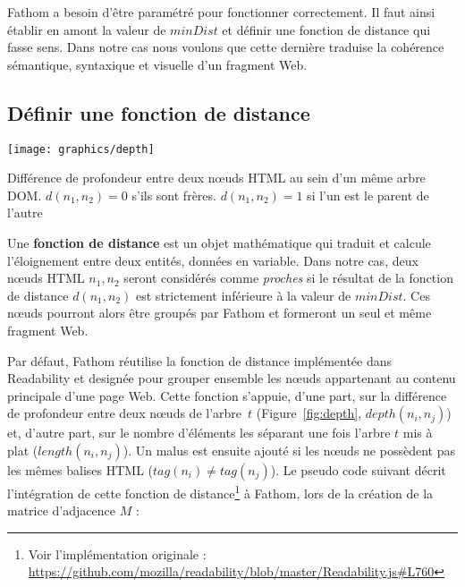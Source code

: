 \documentclass[symmetric,justified,marginals=raggedouter]{tufte-book}
\begin{document}
\noindent Fathom a besoin d'être paramétré pour fonctionner correctement. Il faut ainsi établir en amont la valeur de $minDist$ et définir une fonction de distance qui fasse sens. Dans notre cas nous voulons que cette dernière traduise la cohérence sémantique, syntaxique et visuelle d'un fragment Web. 

\subsection{Définir une fonction de distance}

\begin{marginfigure}%
  \texttt{[image: graphics/depth]}
  \vspace*{0.2cm}  
  \caption{Différence de profondeur entre deux nœuds HTML au sein d'un même arbre DOM. $d(n_1,n_2)=0$ s'ils sont frères. $d(n_1,n_2)=1$ si l'un est le parent de l'autre}
  \label{fig:depth}
\end{marginfigure}

\noindent Une \textbf{fonction de distance} est un objet mathématique qui traduit et calcule l'éloignement entre deux entités, données en variable. Dans notre cas, deux nœuds HTML $n_1,n_2$ seront considérés comme \textit{proches} si le résultat de la fonction de distance $d(n_1,n_2)$ est strictement inférieure à la valeur de $minDist$. Ces nœuds pourront alors être groupés par Fathom et formeront un seul et même fragment Web. 

Par défaut, Fathom réutilise la fonction de distance implémentée dans Readability et designée pour grouper ensemble les nœuds appartenant au contenu principale d'une page Web. Cette fonction s'appuie, d'une part, sur la différence de profondeur entre deux nœuds de l'arbre~$t$ (Figure~\ref{fig:depth}, $depth(n_i,n_j)$) et, d'autre part, sur le nombre d'éléments les séparant une fois l'arbre $t$ mis à plat ($length(n_i,n_j)$). Un malus est ensuite ajouté si les nœuds ne possèdent pas les mêmes balises HTML ($tag(n_i) \neq tag(n_j)$). Le pseudo code suivant décrit l'intégration de cette fonction de distance\footnote{\RaggedOuter Voir l'implémentation originale : \url{https://github.com/mozilla/readability/blob/master/Readability.js\#L760}} à Fathom, lors de la création de la matrice d'adjacence $M$ :  

\begin{algorithm} 
\end{algorithm}
\end{document}
